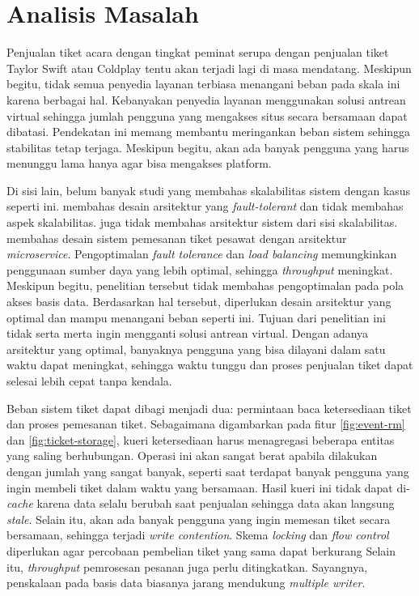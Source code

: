 \section{Analisis Masalah}

Penjualan tiket acara dengan tingkat peminat serupa dengan penjualan tiket Taylor Swift atau Coldplay tentu akan terjadi lagi di masa mendatang. Meskipun begitu, tidak semua penyedia layanan terbiasa menangani beban pada skala ini karena berbagai hal. Kebanyakan penyedia layanan menggunakan solusi antrean virtual sehingga jumlah pengguna yang mengakses situs secara bersamaan dapat dibatasi. Pendekatan ini memang membantu meringankan beban sistem sehingga stabilitas tetap terjaga. Meskipun begitu, akan ada banyak pengguna yang harus menunggu lama hanya agar bisa mengakses platform.

Di sisi lain, belum banyak studi yang membahas skalabilitas sistem dengan kasus seperti ini. \cite{microservicesEventDriven} membahas desain arsitektur yang \textit{fault-tolerant} dan tidak membahas aspek skalabilitas. \cite{backendForTicketing} juga tidak membahas arsitektur sistem dari sisi skalabilitas. \cite{barua2024enhancingresiliencescalabilitytravel} membahas desain sistem pemesanan tiket pesawat dengan arsitektur \textit{microservice}. Pengoptimalan \textit{fault tolerance} dan \textit{load balancing} memungkinkan penggunaan sumber daya yang lebih optimal, sehingga \textit{throughput} meningkat. Meskipun begitu, penelitian tersebut tidak membahas pengoptimalan pada pola akses basis data. Berdasarkan hal tersebut, diperlukan desain arsitektur yang optimal dan mampu menangani beban seperti ini. Tujuan dari penelitian ini tidak serta merta ingin mengganti solusi antrean virtual. Dengan adanya arsitektur yang optimal, banyaknya pengguna yang bisa dilayani dalam satu waktu dapat meningkat, sehingga waktu tunggu dan proses penjualan tiket dapat selesai lebih cepat tanpa kendala.

Beban sistem tiket dapat dibagi menjadi dua: permintaan baca ketersediaan tiket dan proses pemesanan tiket. Sebagaimana digambarkan pada fitur \ref{fig:event-rm} dan \ref{fig:ticket-storage}, kueri ketersediaan harus menagregasi beberapa entitas yang saling berhubungan. Operasi ini akan sangat berat apabila dilakukan dengan jumlah yang sangat banyak, seperti saat terdapat banyak pengguna yang ingin membeli tiket dalam waktu yang bersamaan. Hasil kueri ini tidak dapat di-\textit{cache} karena data selalu berubah saat penjualan sehingga data akan langsung \textit{stale}. Selain itu, akan ada banyak pengguna yang ingin memesan tiket secara bersamaan, sehingga terjadi \textit{write contention}. Skema \textit{locking} dan \textit{flow control} diperlukan agar percobaan pembelian tiket yang sama dapat berkurang Selain itu, \textit{throughput} pemrosesan pesanan juga perlu ditingkatkan. Sayangnya, penskalaan pada basis data biasanya jarang mendukung \textit{multiple writer}.